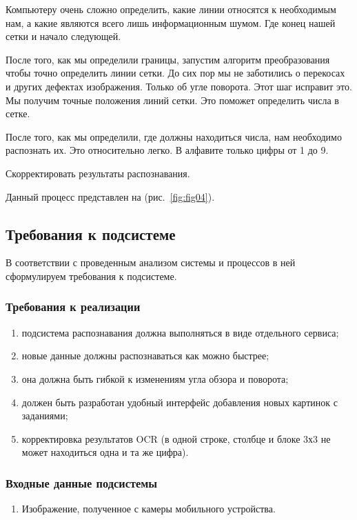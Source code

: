 Компьютеру очень сложно определить, какие линии относятся к необходимым нам, а какие являются всего лишь информационным шумом. Где конец нашей сетки и начало следующей.

После того, как мы определили границы, запустим алгоритм преобразования чтобы точно определить линии сетки. До сих пор мы не заботились о перекосах и других дефектах изображения. Только об угле поворота. Этот шаг исправит это. Мы получим точные положения линий сетки. Это поможет определить числа в сетке.

После того, как мы определили, где должны находиться числа, нам необходимо распознать их. Это относительно легко. В алфавите только цифры от 1 до 9.

Скорректировать результаты распознавания.

Данный процесс представлен на (рис.~\ref{fig:fig04}).

\subsection{Требования к подсистеме}
В соответствии с проведенным анализом системы и процессов в ней сформулируем требования к подсистеме.

\subsubsection*{Требования к реализации}
\begin{enumerate}
 \item подсистема распознавания должна выполняться в виде отдельного сервиса;
 \item новые данные должны распознаваться как можно быстрее;
 \item она должна быть гибкой к изменениям угла обзора и поворота;
 \item должен быть разработан удобный интерфейс добавления новых картинок с заданиями;
 \item корректировка результатов OCR (в одной строке, столбце и блоке 3х3 не может находиться одна и та же цифра).
\end{enumerate}

\subsubsection*{Входные данные подсистемы}

\begin{enumerate}
 \item Изображение, полученное с камеры мобильного устройства.
\end{enumerate}

